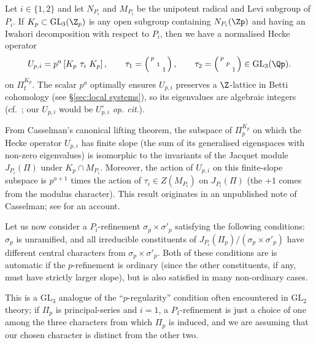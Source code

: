 \documentclass[10pt,reqno,a4paper]{amsart}
\newcommand{\sdthree}[3]{\left(\begin{smallmatrix}#1 \\ & #2\\ && #3\end{smallmatrix}\right)}
\newcommand{\Pif}{\Pi\subf}
\newcommand{\subf}{_{\mathrm{f}}}
\newcommand{\GL}{\mathrm{GL}}
\begin{document}
Let $i \in \{1, 2\}$ and let $N_{P_i}$ and $M_{P_i}$ be the unipotent radical and Levi subgroup of $P_i$. If $K_p \subset \GL_3(\Z_p)$ is any open subgroup containing $N_{P_i}(\Zp)$ and having an Iwahori decomposition with respect to $P_i$, then we have a normalised Hecke operator
\begin{equation}\label{eq:tau}
U_{p, i} = p^a \left[K_p \ \tau_i \ K_p\right], \qquad 	\tau_1 =  \sdthree{p}{1}{1}, \qquad \tau_2 = \sdthree{p}{p}{1} \in \GL_3(\Qp).
\end{equation}
on $\Pif^{K_p}$. The scalar $p^a$ optimally ensures $U_{p,i}$ preserves a $\Z$-lattice in Betti cohomology (see \S\ref{sec:local systems}), so its eigenvalues are algebraic integers (cf.\ \cite[Rem.\ 3.13]{BDW20}; our $U_{p,i}$ would be $U_{p,i}^\circ$ \emph{op. cit}.).


 From Casselman's canonical lifting theorem, the subspace of $\Pi_p^{K_p}$ on which the Hecke operator $U_{p, i}$ has finite slope (the sum of its generalised eigenspaces with non-zero eigenvalues) is isomorphic to the invariants of the Jacquet module $J_{P_i}(\Pi)$ under $K_p \cap M_{P_i}$. Moreover, the action of $U_{p, i}$ on this finite-slope subspace is $p^{a+1}$ times the action of $\tau_i \in Z(M_{P_i})$ on $J_{P_i}(\Pi)$ (the $+1$ comes from the modulus character). This result originates in an unpublished note of Casselman; see \cite{EmertonJacquetI} for an account.

 Let us now consider a $P_i$-refinement $\sigma_p \times \sigma'_p$ satisfying the following conditions: $\sigma_p$ is unramified, and all irreducible constituents of $J_{P_i}(\Pi_p) / (\sigma_p \times \sigma'_p)$ have different central characters from $\sigma_p \times \sigma'_p$. Both of these conditions are is automatic if the $p$-refinement is ordinary (since the other constituents, if any, must have strictly larger slope), but is also satisfied in many non-ordinary cases.

 \begin{remark}
  This is a $\GL_3$ analogue of the ``$p$-regularity'' condition often encountered in $\GL_2$ theory; if $\Pi_p$ is principal-series and $i = 1$, a $P_1$-refinement is just a choice of one among the three characters from which $\Pi_p$ is induced, and we are assuming that our chosen character is distinct from the other two.
 \end{remark}
\end{document}
